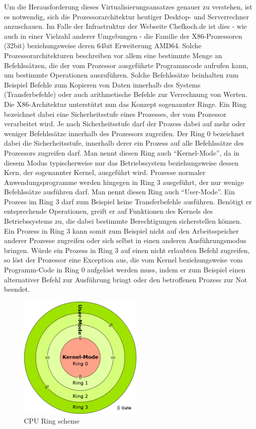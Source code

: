 Um die Herausforderung dieses Virtualisierungsansatzes genauer zu verstehen, ist es notwendig, sich die Prozessorarchitektur heutiger Desktop- und Serverrechner anzuschauen. Im Falle der Infrastruktur der Webseite Chefkoch.de ist dies - wie auch in einer Vielzahl anderer Umgebungen - die Familie der X86-Prozessoren (32bit) beziehungsweise deren 64bit Erweiterung AMD64. Solche Prozessorarchitekturen beschreiben vor allem eine bestimmte Menge an Befehlssätzen, die der vom Prozessor ausgeführte Programmcode aufrufen kann, um bestimmte Operationen auszuführen. Solche Befehlssätze beinhalten zum Beispiel Befehle zum Kopieren von Daten innerhalb des Systems (Transferbefehle) oder auch arithmetische Befehle zur Verrechnung von Werten. Die X86-Architektur unterstützt nun das Konzept sogenannter Ringe. Ein Ring bezeichnet dabei eine Sicherheitsstufe eines Prozesses, der vom Prozessor verarbeitet wird. Je nach Sicherheitsstufe darf der Prozess dabei auf mehr oder weniger Befehlssätze innerhalb des Prozessors zugreifen. Der Ring 0 bezeichnet dabei die Sicherheitsstufe, innerhalb derer ein Prozess auf alle Befehlssätze des Prozessors zugreifen darf. Man nennt diesen Ring auch "`Kernel-Mode"', da in diesem Modus typischerweise nur das Betriebssystem beziehungsweise dessen Kern, der sogenannter Kernel, ausgeführt wird. Prozesse normaler Anwendungsprogramme werden hingegen in Ring 3 ausgeführt, der nur wenige Befehlssätze ausführen darf. Man nennt diesen Ring auch "`User-Mode"'. Ein Prozess im Ring 3 darf zum Beispiel keine Transferbefehle ausführen. Benötigt er entsprechende Operationen, greift er auf Funktionen des Kernels des Betriebssystems zu, die dabei bestimmte Berechtigungen sicherstellen können. Ein Prozess in Ring 3 kann somit zum Beispiel nicht auf den Arbeitsspeicher anderer Prozesse zugreifen oder sich selbst in einen anderen Ausführungsmodus bringen. Würde ein Prozess in Ring 3 auf einen nicht erlaubten Befehl zugreifen, so löst der Prozessor eine Exception aus, die vom Kernel beziehungsweise vom Programm-Code in Ring 0 aufgelöst werden muss, indem er zum Beispiel einen alternativer Befehl zur Ausführung bringt oder den betroffenen Prozess zur Not beendet.

\begin{figure}[!ht]
  \begin{center}
    \includegraphics[width=6cm]{bilder/500px-CPU_ring_scheme.png}
    \caption{CPU Ring scheme \citep{wiki:006}}
  \end{center}
\end{figure}

